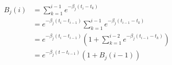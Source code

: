 \documentclass{article}
\begin{document}
$\begin{array}{ll}
  B_j ( i) & = \sum_{k = 1}^{i - 1} e^{- \beta_j ( t_i - t_k)}\\
  & = e^{- \beta_j ( t_i - t_{i - 1})}_{} \sum_{k = 1}^{i - 1} e^{- \beta_j (
  t_{i - 1} - t_k)}\\
  & = e^{- \beta_j ( t_i - t_{i - 1})}_{}  \left( 1 + \sum_{k = 1}^{i - 2}
  e^{- \beta_j ( t_{i - 1} - t_k)} \right)\\
  & = e^{- \beta_j ( t - t_{i - 1})} ( 1 + B_j ( i - 1))
\end{array}$
\end{document}
